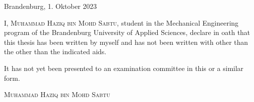 \thispagestyle{empty}

\large
\begin{flushright}
  Brandenburg, 1. Oktober 2023
\end{flushright}

\vspace*{50mm}
I, {\scshape Muhammad Haziq bin Mohd Sabtu}, student in the Mechanical Engineering program of the Brandenburg University of Applied Sciences, declare in oath that this thesis has been written by myself and has not been written with other than the other than the indicated aids.

It has not yet been presented to an examination committee in this or a similar form.

\vspace*{50mm}

\begin{flushright}
  {\scshape Muhammad Haziq bin Mohd Sabtu}
\end{flushright}

\normalsize